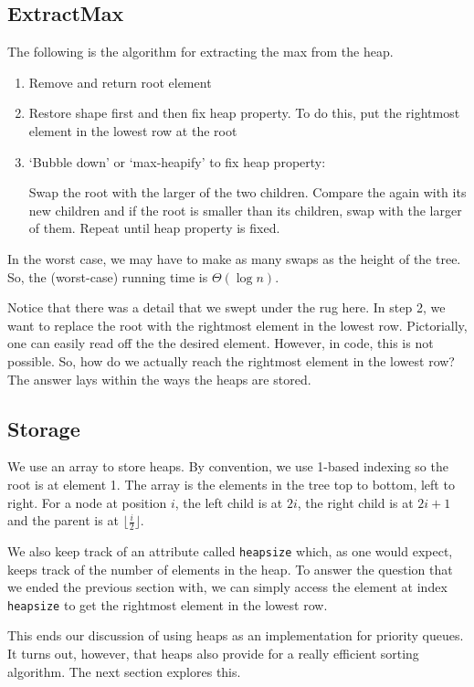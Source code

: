 \documentclass[11pt]{article}
\begin{document}
\subsection{ExtractMax}
The following is the algorithm for extracting the max from the heap. 
\begin{enumerate}
    \item Remove and return root element
    \item Restore shape first and then fix heap property. To do this, put the rightmost element in the lowest row at the root
    \item `Bubble down' or `max-heapify' to fix heap property:
    
    Swap the root with the larger of the two children. Compare the again with its new children and if the root is smaller than its children, swap with the larger of them. Repeat until heap property is fixed. 
\end{enumerate}
In the worst case, we may have to make as many swaps as the height of the tree. So, the (worst-case) running time is $\Theta(\log n)$. 

Notice that there was a detail that we swept under the rug here. In step 2, we want to replace the root with the rightmost element in the lowest row. Pictorially, one can easily read off the the desired element. However, in code, this is not possible. So, how do we actually reach the rightmost element in the lowest row? The answer lays within the ways the heaps are stored. 

\subsection{Storage}

We use an array to store heaps. By convention, we use 1-based indexing so the root is at element 1. The array is the elements in the tree top to bottom, left to right. For a node at position $i$, the left child is at $2i$, the right child is at $2i+1$ and the parent is at $\lfloor \frac{i}{2} \rfloor$.

We also keep track of an attribute called \texttt{heapsize} which, as one would expect, keeps track of the number of elements in the heap. To answer the question that we ended the previous section with, we can simply access the element at index \texttt{heapsize} to get the rightmost element in the lowest row. 

This ends our discussion of using heaps as an implementation for priority queues. It turns out, however, that heaps also provide for a really efficient sorting algorithm. The next section explores this. 
\end{document}
